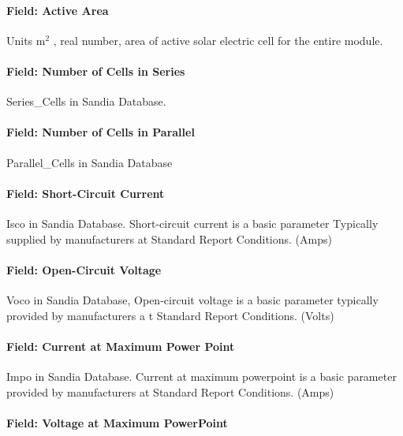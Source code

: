 \paragraph{Field: Active Area}\label{field-active-area-1}

Units m\(^{2}\) , real number, area of active solar electric cell for the entire module.

\paragraph{Field: Number of Cells in Series}\label{field-number-of-cells-in-series-1}

Series\_Cells in Sandia Database.

\paragraph{Field: Number of Cells in Parallel}\label{field-number-of-cells-in-parallel}

Parallel\_Cells in Sandia Database

\paragraph{Field: Short-Circuit Current}\label{field-short-circuit-current-1}

Isco in Sandia Database. Short-circuit current is a basic parameter Typically supplied by manufacturers at Standard Report Conditions. (Amps)

\paragraph{Field: Open-Circuit Voltage}\label{field-open-circuit-voltage-1}

Voco in Sandia Database, Open-circuit voltage is a basic parameter typically provided by manufacturers a t Standard Report Conditions. (Volts)

\paragraph{Field: Current at Maximum Power Point}\label{field-current-at-maximum-power-point}

Impo in Sandia Database. Current at maximum powerpoint is a basic parameter provided by manufacturers at Standard Report Conditions. (Amps)

\paragraph{Field: Voltage at Maximum PowerPoint}\label{field-voltage-at-maximum-powerpoint}

